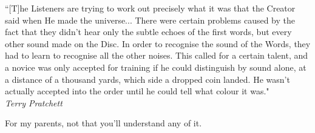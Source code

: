 \documentclass[11pt]{cuthesis}
\begin{document}
\declaration

\tableofcontents
\listoffigures
\listoftables

\begin{dedication}
    ``[T]he Listeners are trying to work out precisely what it was that the Creator said when He made the universe...  There were certain problems caused by the fact that they didn't hear only the subtle echoes of the first words, but every other sound made on the Disc. In order to recognise the sound of the Words, they had to learn to recognise all the other noises. This called for a certain talent, and a novice was only accepted for training if he could distinguish by sound alone, at a distance of a thousand yards, which side a dropped coin landed. He wasn't actually accepted into the order until he could tell what colour it was."\\
    \vspace{1cm}
    \hfill \textit{Terry Pratchett}
\end{dedication}

\begin{dedication}
For my parents, not that you'll understand any of it.
\end{dedication}

\end{document}
